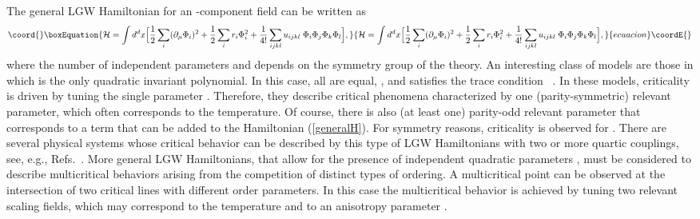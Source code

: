 \documentclass[a4paper,12pt]{article}
\begin{document}
The general LGW Hamiltonian for an \coordHE{}-component field \coordHE{}
can be written as
\begin{equation}\coord{}\boxEquation{
{\cal H} = \int d^d x \Bigl[ 
{1\over 2} \sum_i (\partial_\mu \Phi_{i})^2 + 
{1\over 2} \sum_i r_i \Phi_{i}^2  + 
{1\over 4!} \sum_{ijkl} u_{ijkl} \; \Phi_i\Phi_j\Phi_k\Phi_l \Bigr], 
\label{generalH}
}{
{\cal H} = \int d^d x \Bigl[ 
{1\over 2} \sum_i (\partial_\mu \Phi_{i})^2 + 
{1\over 2} \sum_i r_i \Phi_{i}^2  + 
{1\over 4!} \sum_{ijkl} u_{ijkl} \; \Phi_i\Phi_j\Phi_k\Phi_l \Bigr], 
}{ecuacion}\coordE{}\end{equation}
where the number of independent parameters \coordHE{} and \coordHE{} 
depends on the symmetry group of the theory. An interesting 
class of models are those in which \coordHE{} is the 
only quadratic invariant polynomial.
In this case, all \coordHE{} are equal, \coordHE{}, and 
\coordHE{} satisfies the trace condition~\cite{BLZ-76}
\coordHE{}.
In these models, criticality is driven by tuning the single parameter
\coordHE{}. Therefore, they describe critical phenomena characterized 
by one (parity-symmetric) relevant parameter, 
which often corresponds to the temperature. Of course, there is also
(at least one) parity-odd relevant parameter that corresponds to 
a term \coordHE{} that can be added to the Hamiltonian
(\ref{generalH}). For symmetry reasons, criticality is observed 
for \coordHE{}. 
There are several physical systems whose critical behavior 
can be described by this type of LGW Hamiltonians with two or more quartic 
couplings, see, e.g., Refs.~\cite{Aharony-76,review}.
More general LGW Hamiltonians, that allow for the presence
of independent quadratic parameters \coordHE{}, must be considered
to describe multicritical behaviors 
arising from the competition of distinct types of ordering.
A multicritical point can be observed at the intersection of 
two critical lines with different order parameters.
In this case the multicritical behavior is achieved
by tuning two relevant scaling fields, which may correspond to
the temperature and to an anisotropy parameter \cite{KNF-76}.
\end{document}
